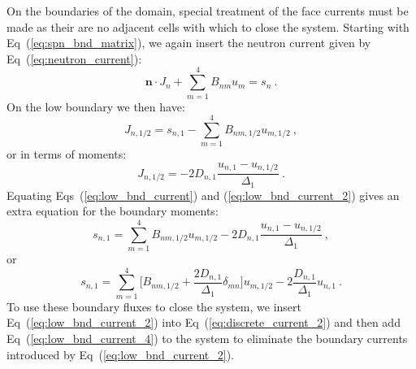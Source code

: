 On the boundaries of the domain, special treatment of the face
currents must be made as their are no adjacent cells with which to
close the system. Starting with Eq~(\ref{eq:spn_bnd_matrix}), we again
insert the neutron current given by Eq~(\ref{eq:neutron_current}):
\begin{equation}
  \mathbf{n} \cdot J_n + \sum_{m=1}^4 B_{nm} u_m = s_n\:.
  \label{eq:boundary_current_system}
\end{equation}
On the low boundary we then have:
\begin{equation}
  J_{n,1/2} = s_{n,1} - \sum_{m=1}^4 B_{nm,1/2} u_{m,1/2}\:,
  \label{eq:low_bnd_current}
\end{equation}
or in terms of moments:
\begin{equation}
  J_{n,1/2} = -2 D_{n,1}\frac{u_{n,1} - u_{n,1/2}}{\Delta_1}\:.
  \label{eq:low_bnd_current_2}
\end{equation}
Equating Eqs~(\ref{eq:low_bnd_current}) and
(\ref{eq:low_bnd_current_2}) gives an extra equation for the boundary
moments:
\begin{equation}
  s_{n,1} = \sum_{m=1}^4 B_{nm,1/2} u_{m,1/2} -2 D_{n,1}\frac{u_{n,1}
    - u_{n,1/2}}{\Delta_1}\:,
  \label{eq:low_bnd_current_3}
\end{equation}
or
\begin{equation}
  s_{n,1} = \sum_{m=1}^4 \Big[B_{nm,1/2} + \frac{2
      D_{n,1}}{\Delta_1}\delta_{mn} \Big] u_{m,1/2} -2
  \frac{D_{n,1}}{\Delta_1} u_{n,1}\:.
  \label{eq:low_bnd_current_4}
\end{equation}
To use these boundary fluxes to close the system, we insert
Eq~(\ref{eq:low_bnd_current_2}) into Eq~(\ref{eq:discrete_current_2})
and then add Eq~(\ref{eq:low_bnd_current_4}) to the system to
eliminate the boundary currents introduced by
Eq~(\ref{eq:low_bnd_current_2}).

